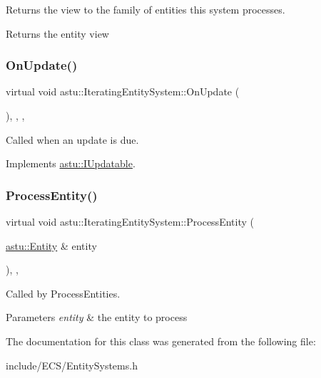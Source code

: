 Returns the view to the family of entities this system processes.

\begin{DoxyReturn}{Returns}
the entity view 
\end{DoxyReturn}
\mbox{\label{classastu_1_1IteratingEntitySystem_a7534ceb189ea282024bb9917cc244e94}} 
\subsubsection{\texorpdfstring{On\+Update()}{OnUpdate()}}
{\footnotesize\ttfamily virtual void astu\+::\+Iterating\+Entity\+System\+::\+On\+Update (\begin{DoxyParamCaption}{ }\end{DoxyParamCaption})\hspace{0.3cm}{\ttfamily [inline]}, {\ttfamily [override]}, {\ttfamily [protected]}, {\ttfamily [virtual]}}

Called when an update is due. 

Implements \hyperlink{classastu_1_1IUpdatable_a76c7c6e2a71b725bbdbdf6808ef4743f}{astu\+::\+I\+Updatable}.

\mbox{\label{classastu_1_1IteratingEntitySystem_a76c7d21da428aa7a6435dc3692fbe6f2}} 
\subsubsection{\texorpdfstring{Process\+Entity()}{ProcessEntity()}}
{\footnotesize\ttfamily virtual void astu\+::\+Iterating\+Entity\+System\+::\+Process\+Entity (\begin{DoxyParamCaption}\item[{\hyperlink{classastu_1_1Entity}{astu\+::\+Entity} \&}]{entity }\end{DoxyParamCaption})\hspace{0.3cm}{\ttfamily [inline]}, {\ttfamily [protected]}, {\ttfamily [virtual]}}

Called by \textquotesingle{}Process\+Entities\textquotesingle{}.


\begin{DoxyParams}{Parameters}
{\em entity} & the entity to process \\
\hline
\end{DoxyParams}


The documentation for this class was generated from the following file\+:\begin{DoxyCompactItemize}
\item 
include/\+E\+C\+S/Entity\+Systems.\+h\end{DoxyCompactItemize}
